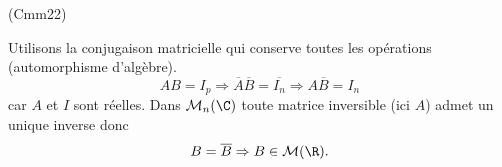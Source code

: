 \begin{tiny}(Cmm22)\end{tiny} Utilisons la conjugaison matricielle qui conserve toutes les opérations (automorphisme d'algèbre).
\[
  AB = I_p \Rightarrow \overline{A} \overline{B} = \overline{I_n}
  \Rightarrow A \overline{B} = I_n
\]
car $A$ et $I$ sont réelles. Dans $\mathcal{M}_n(\C)$ toute matrice inversible (ici $A$) admet un unique inverse donc
\[
  B = \overline{B} \Rightarrow B \in \mathcal{M}(\R).
\]

